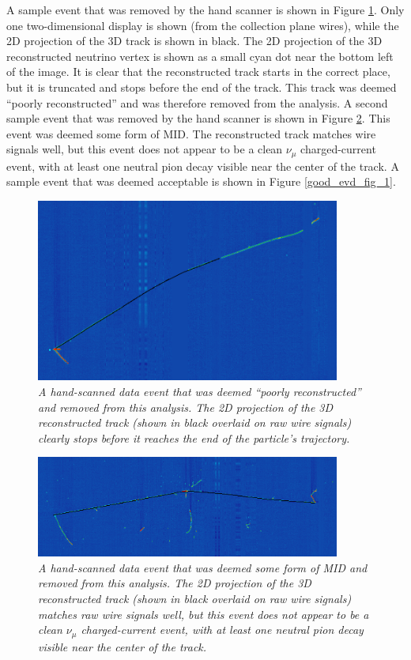 A sample event that was removed by the hand scanner is shown in Figure \ref{bad_evd_fig_1}. Only one two-dimensional display is shown (from the collection plane wires), while the 2D projection of the 3D track is shown in black. The 2D projection of the 3D reconstructed neutrino vertex is shown as a small cyan dot near the bottom left of the image. It is clear that the reconstructed track starts in the correct place, but it is truncated and stops before the end of the track. This track was deemed ``poorly reconstructed'' and was therefore removed from the analysis. A second sample event that was removed by the hand scanner is shown in Figure \ref{bad_evd_fig_2}. This event was deemed some form of MID. The reconstructed track matches wire signals well, but this event does not appear to be a clean $\nu_\mu$ charged-current event, with at least one neutral pion decay visible near the center of the track. A sample event that was deemed acceptable is shown in Figure \ref{good_evd_fig_1}.

\begin{figure}[h!]
\begin{center}
\includegraphics[width=100mm]{Figures/bad_evd_1.png}
\end{center}
\caption{\textit{A hand-scanned data event that was deemed ``poorly reconstructed'' and removed from this analysis. The 2D projection of the 3D reconstructed track (shown in black overlaid on raw wire signals) clearly stops before it reaches the end of the particle's trajectory.}}
\label{bad_evd_fig_1}
\end{figure}

\begin{figure}[h!]
\begin{center}
\includegraphics[width=100mm]{Figures/bad_evd_2.png}
\end{center}
\caption{\textit{A hand-scanned data event that was deemed some form of MID and removed from this analysis. The 2D projection of the 3D reconstructed track (shown in black overlaid on raw wire signals) matches raw wire signals well, but this event does not appear to be a clean $\nu_\mu$ charged-current event, with at least one neutral pion decay visible near the center of the track.}}
\label{bad_evd_fig_2}
\end{figure}

